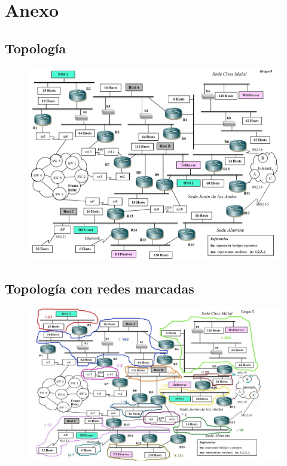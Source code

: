 \documentclass[12pt, a4paper, spanish]{article}
\begin{document}
\newpage
\section{Anexo}
\subsection{Topología}
\begin{figure}[h!]
	\centering
	\includegraphics[scale=0.42,angle=90]{diagramas/topologia.png} \\
\end{figure}

\subsection{Topología con redes marcadas}
\begin{figure}[h!]
	\centering
	\includegraphics[scale=0.85,angle=90]{diagramas/topologia_marcada.jpg} \\
\end{figure}

\end{document}
